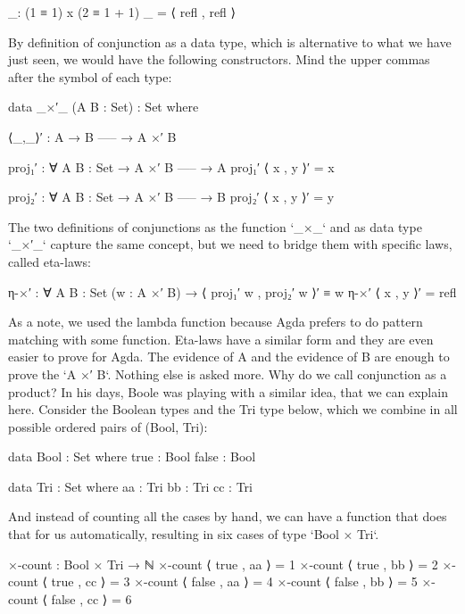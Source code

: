 \documentclass{lecturenotes}
\begin{document}
\begin{code}
_: (1 ≡ 1)  x  (2 ≡ 1 + 1)
_ = ⟨ refl , refl ⟩
\end{code}

By definition of conjunction as a data type, which is alternative to what we have just seen, we would have the following constructors.
Mind the upper commas after the symbol of each type:

\begin{code}
data _×′_ (A B : Set) : Set where

  ⟨_,_⟩′ :
      A
    → B
      -----
    → A ×′ B

proj₁′ : ∀ {A B : Set}
  → A ×′ B
    -----
  → A
proj₁′ ⟨ x , y ⟩′ = x

proj₂′ : ∀ {A B : Set}
  → A ×′ B
    -----
  → B
proj₂′ ⟨ x , y ⟩′ = y
\end{code}

The two definitions of conjunctions as the function `_×_` and as data type `_×′_` capture the same concept, but we need to bridge them with specific laws, called eta-laws:

\begin{code}
η-×′ : ∀ {A B : Set} (w : A ×′ B) → ⟨ proj₁′ w , proj₂′ w ⟩′ ≡ w
η-×′ ⟨ x , y ⟩′ = refl
\end{code}

As a note, we used the lambda function because Agda prefers to do pattern matching with some function.
Eta-laws have a similar form and they are even easier to prove for Agda.
The evidence of A and the evidence of B are enough to prove the `A ×′ B`. Nothing else is asked more.
Why do we call conjunction as a product? In his days, Boole was playing with a similar idea, that we can explain here.
Consider the Boolean types and the Tri type below, which we combine in all possible ordered pairs of (Bool, Tri):

\begin{code}
data Bool : Set where
  true  : Bool
  false : Bool

data Tri : Set where
  aa : Tri
  bb : Tri
  cc : Tri
\end{code}

And instead of counting all the cases by hand, we can have a function that does that for us automatically, resulting in six cases of type `Bool × Tri`.

\begin{code}
×-count : Bool × Tri → ℕ
×-count ⟨ true  , aa ⟩  =  1
×-count ⟨ true  , bb ⟩  =  2
×-count ⟨ true  , cc ⟩  =  3
×-count ⟨ false , aa ⟩  =  4
×-count ⟨ false , bb ⟩  =  5
×-count ⟨ false , cc ⟩  =  6
\end{code}
\end{document}
